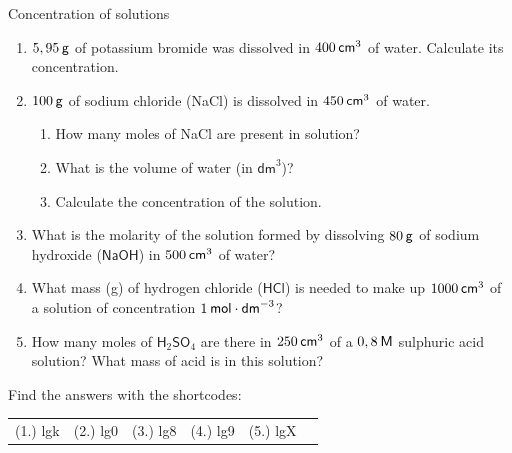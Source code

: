             \begin{exercises}{ Concentration of solutions
      }
            \nopagebreak
      \label{m38712*id283713}\begin{enumerate}[noitemsep, label=\textbf{\arabic*}. ] 
            \label{m38712*uid92}\item $5,95\phantom{\rule{2pt}{0ex}}\mathsf{g}$ of potassium bromide was dissolved in $400\phantom{\rule{2pt}{0ex}}{\mathsf{cm}}^{3}$ of water. Calculate its concentration.\newline
\label{m38712*uid93}\item $100\phantom{\rule{2pt}{0ex}}\mathsf{g}$ of sodium chloride (NaCl) is dissolved in $450\phantom{\rule{2pt}{0ex}}{\mathsf{cm}}^{3}$ of water.
\label{m38712*id283768}\begin{enumerate}[noitemsep, label=\textbf{\alph*}. ] 
            \label{m38712*uid94}\item How many moles of NaCl are present in solution?
\label{m38712*uid95}\item What is the volume of water (in ${\mathsf{dm}}^{3}$)?
\label{m38712*uid96}\item Calculate the concentration of the solution.
\end{enumerate}
                \label{m38712*uid98}\item What is the molarity of the solution formed by dissolving $80\phantom{\rule{2pt}{0ex}}\mathsf{g}$ of sodium hydroxide ($\mathsf{NaOH}$) in $500\phantom{\rule{2pt}{0ex}}{\mathsf{cm}}^{3}$ of water?\newline
\label{m38712*uid99}\item What mass (g) of hydrogen chloride ($\mathsf{HCl}$) is needed to make up $1000\phantom{\rule{2pt}{0ex}}{\mathsf{cm}}^{3}$ of a solution of concentration $1\phantom{\rule{2pt}{0ex}}\mathsf{mol}\ensuremath{\cdot}{\mathsf{dm}}^{-3}$?\newline
\label{m38712*uid100}\item How many moles of $\mathsf{H}{}_{2}\mathsf{SO}{}_{4}$ are there in $250\phantom{\rule{2pt}{0ex}}{\mathsf{cm}}^{3}$ of a $0,8\phantom{\rule{2pt}{0ex}}\mathsf{M}$ sulphuric acid solution? What mass of acid is in this solution?\newline
\end{enumerate}
    \label{m38712*cid9}
\par {} Find the answers with the shortcodes:
 \par \begin{tabular}[h]{cccccc}
 (1.) lgk  &  (2.) lg0  &  (3.) lg8  &  (4.) lg9  &  (5.) lgX  & \end{tabular}
\end{exercises}
